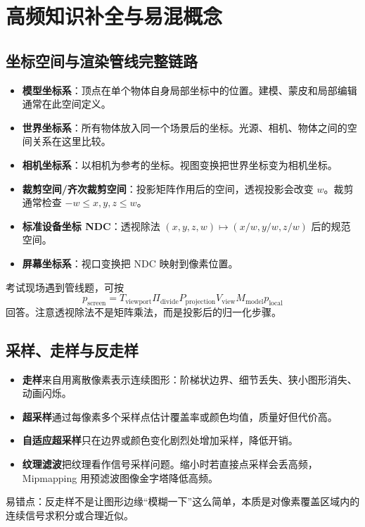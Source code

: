 \documentclass[UTF8,fontset=fandol,11pt]{ctexart}
\newcommand{\key}[1]{\textbf{#1}}
\begin{document}
\newpage
\section{高频知识补全与易混概念}
\subsection{坐标空间与渲染管线完整链路}
\begin{itemize}
  \item \key{模型坐标系}：顶点在单个物体自身局部坐标中的位置。建模、蒙皮和局部编辑通常在此空间定义。
  \item \key{世界坐标系}：所有物体放入同一个场景后的坐标。光源、相机、物体之间的空间关系在这里比较。
  \item \key{相机坐标系}：以相机为参考的坐标。视图变换把世界坐标变为相机坐标。
  \item \key{裁剪空间/齐次裁剪空间}：投影矩阵作用后的空间，透视投影会改变 $w$。裁剪通常检查 $-w\le x,y,z\le w$。
  \item \key{标准设备坐标 NDC}：透视除法 $(x,y,z,w)\mapsto(x/w,y/w,z/w)$ 后的规范空间。
  \item \key{屏幕坐标系}：视口变换把 NDC 映射到像素位置。
\end{itemize}
考试现场遇到管线题，可按
\[
  p_{\text{screen}}=T_{\text{viewport}}\Pi_{\text{divide}}P_{\text{projection}}V_{\text{view}}M_{\text{model}}p_{\text{local}}
\]
回答。注意透视除法不是矩阵乘法，而是投影后的归一化步骤。

\subsection{采样、走样与反走样}
\begin{itemize}
  \item \key{走样}来自用离散像素表示连续图形：阶梯状边界、细节丢失、狭小图形消失、动画闪烁。
  \item \key{超采样}通过每像素多个采样点估计覆盖率或颜色均值，质量好但代价高。
  \item \key{自适应超采样}只在边界或颜色变化剧烈处增加采样，降低开销。
  \item \key{纹理滤波}把纹理看作信号采样问题。缩小时若直接点采样会丢高频，Mipmapping 用预滤波图像金字塔降低高频。
\end{itemize}
易错点：反走样不是让图形边缘“模糊一下”这么简单，本质是对像素覆盖区域内的连续信号求积分或合理近似。
\end{document}
